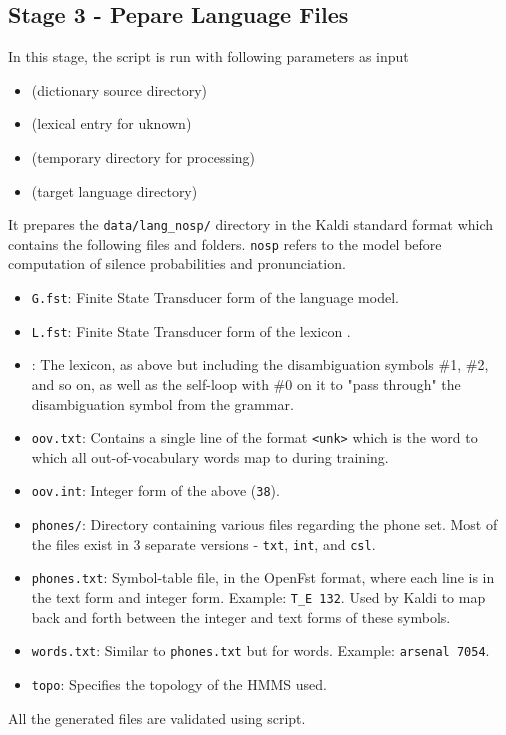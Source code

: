 \subsection{Stage 3 - Pepare Language Files}
In this stage, the  script is run with following parameters as input
\begin{itemize}
    \item {} (dictionary source directory)
    \item {} (lexical entry for uknown)
    \item {} (temporary directory for processing)
    \item {} (target language directory)
\end{itemize}

It prepares the \texttt{data/lang\_nosp/} directory in the Kaldi standard format which contains the following files and folders. \texttt{nosp} refers to the model before computation of silence probabilities and pronunciation.
\begin{itemize}
    \item \texttt{G.fst}: Finite State Transducer form of the language model.
    \item \texttt{L.fst}: Finite State Transducer form of the lexicon .
    \item {}: The lexicon, as above but including the disambiguation symbols \#1, \#2, and so on, as well as the self-loop with \#0 on it to "pass through" the disambiguation symbol from the grammar.
    \item \texttt{oov.txt}: Contains a single line of the format \texttt{<unk>} which is the word to which all out-of-vocabulary words map to during training.
    \item \texttt{oov.int}: Integer form of the above (\texttt{38}).
    \item \texttt{phones/}: Directory containing various files regarding the phone set. Most of the files exist in 3 separate versions - \texttt{txt}, \texttt{int}, and \texttt{csl}.
    \item \texttt{phones.txt}: Symbol-table file, in the OpenFst format, where each line is in the text form and integer form. Example: \texttt{T\_E 132}. Used by Kaldi to map back and forth between the integer and text forms of these symbols.
    \item \texttt{words.txt}: Similar to \texttt{phones.txt} but for words. Example: \texttt{arsenal 7054}.
    \item \texttt{topo}: Specifies the topology of the HMMS used.
\end{itemize}

All the generated files are validated using  script.
